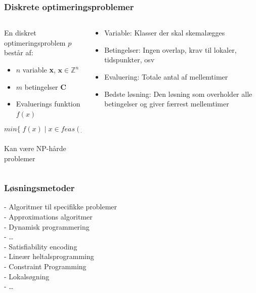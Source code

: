 \documentclass[smaller,handouts]{beamer}
\begin{document}
\begin{frame}
\frametitle{Diskrete optimeringsproblemer}
\begin{columns}[T]
    \begin{column}[T]{.5\textwidth}
        \vspace{0pt}
   En diskret optimeringsproblem $p$ består af: 
\pause
    \begin{itemize}[<+->]
\item $n$ variable \textbf{x}, $\mathbf{x} \in \mathbb{Z}^n$
\item $m$ betingelser \textbf{C}
\item Evaluerings funktion $f(x)$ \medskip \\
\end{itemize}
  \alert{\[min \{\; f(x) \;| \; x  \in feas(p)\}\]} \\
  Kan være NP-hårde problemer
 \end{column}
    \hfill
    \begin{column}[T]{.5\textwidth}
      \pause \pause
\begin{itemize}[<+->]
 \item Variable: Klasser der skal skemalægges
 \item Betingelser: Ingen overlap, krav til lokaler, tidspunkter, osv
\item Evaluering: Totale antal af mellemtimer
 \item Bedste løsning: Den løsning som overholder alle betingelser og giver færrest mellemtimer
\end{itemize}
    \end{column}
    \end{columns}
\end{frame}

\begin{frame}
 \frametitle{Løsningsmetoder}
  - Algoritmer til specifikke problemer  \\ \hspace{1cm}\pause
      - Approximations algoritmer \\  \hspace{1cm}\pause 
      - Dynamisk programmering \\ \pause
 - \dots \\ 
 - Satisfiability encoding \\ \pause 
 - Lineær heltalsprogramming \\ \pause 
 - Constraint Programming \\ \pause
 - Lokalsøgning \\ 
 - \dots
 
\end{frame}
\end{document}
